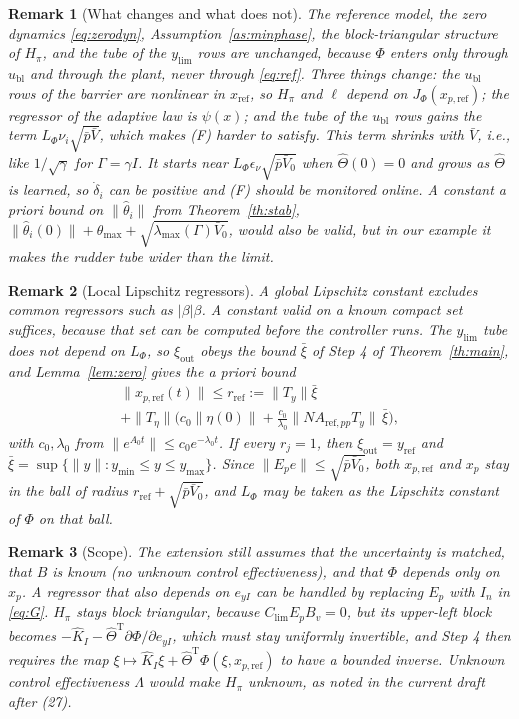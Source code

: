 \documentclass[lettersize,journal]{IEEEtran}
\newtheorem{remark}{Remark}
\newcommand{\Kh}{\hat{K}}
\newcommand{\xr}{x_{\mathrm{ref}}}
\newcommand{\xpr}{x_{p,\mathrm{ref}}}
\newcommand{\App}{A_{\mathrm{ref},pp}}
\newcommand{\ub}{u_{\mathrm{bl}}}
\newcommand{\yref}{y_{\mathrm{ref}}}
\newcommand{\Clim}{C_{\mathrm{lim}}}
\newcommand{\ylim}{y_{\mathrm{lim}}}
\newcommand{\eyI}{e_{yI}}
\newcommand{\Vb}{\bar{V}}
\newcommand{\tmax}{\theta_{\max}}
\newcommand{\T}{\mathrm{T}}
\begin{document}
\begin{remark}[What changes and what does not]
The reference model, the zero dynamics \eqref{eq:zerodyn}, Assumption~\ref{as:minphase}, the block-triangular structure of $H_\pi$, and the tube of the $\ylim$ rows are unchanged, because $\Phi$ enters only through $\ub$ and through the plant, never through \eqref{eq:ref}. Three things change: the $\ub$ rows of the barrier are nonlinear in $\xr$, so $H_\pi$ and $\ell$ depend on $J_\Phi(\xpr)$; the regressor of the adaptive law is $\psi(x)$; and the tube of the $\ub$ rows gains the term $L_\Phi\nu_i\sqrt{\bar p\Vb}$, which makes (F) harder to satisfy. This term shrinks with $\Vb$, i.e., like $1/\sqrt\gamma$ for $\Gamma=\gamma I$. It starts near $L_\Phi\epsilon_\nu\sqrt{\bar p\Vb_0}$ when $\hat\Theta(0)=0$ and grows as $\hat\Theta$ is learned, so $\dot\delta_i$ can be positive and (F) should be monitored online. A constant a priori bound on $\|\hat\theta_i\|$ from Theorem~\ref{th:stab}, $\|\hat\theta_i(0)\|+\tmax+\sqrt{\lambda_{\max}(\Gamma)\Vb_0}$, would also be valid, but in our example it makes the rudder tube wider than the limit.
\end{remark}

\begin{remark}[Local Lipschitz regressors]
A global Lipschitz constant excludes common regressors such as $|\beta|\beta$. A constant valid on a known compact set suffices, because that set can be computed before the controller runs. The $\ylim$ tube does not depend on $L_\Phi$, so $\xi_{\mathrm{out}}$ obeys the bound $\bar\xi$ of Step 4 of Theorem~\ref{th:main}, and Lemma~\ref{lem:zero} gives the a priori bound
\begin{multline*}
\|\xpr(t)\|\le r_{\mathrm{ref}}:=\|T_y\|\bar\xi \\
+ \|T_\eta\|\Big(c_0\|\eta(0)\|+\frac{c_0}{\lambda_0}\|N\App T_y\|\,\bar\xi\Big),
\end{multline*}
with $c_0,\lambda_0$ from $\|e^{A_0t}\|\le c_0e^{-\lambda_0t}$. If every $r_j=1$, then $\xi_{\mathrm{out}}=\yref$ and $\bar\xi=\sup\{\|y\|: y_{\min}\le y\le y_{\max}\}$. Since $\|E_pe\|\le\sqrt{\bar p\Vb_0}$, both $\xpr$ and $x_p$ stay in the ball of radius $r_{\mathrm{ref}}+\sqrt{\bar p\Vb_0}$, and $L_\Phi$ may be taken as the Lipschitz constant of $\Phi$ on that ball.
\end{remark}

\begin{remark}[Scope]
The extension still assumes that the uncertainty is matched, that $B$ is known (no unknown control effectiveness), and that $\Phi$ depends only on $x_p$. A regressor that also depends on $\eyI$ can be handled by replacing $E_p$ with $I_n$ in \eqref{eq:G}. $H_\pi$ stays block triangular, because $\Clim E_pB_v=0$, but its upper-left block becomes $-\Kh_I-\hat\Theta^\T\partial\Phi/\partial\eyI$, which must stay uniformly invertible, and Step 4 then requires the map $\xi\mapsto\Kh_I\xi+\hat\Theta^\T\Phi(\xi,\xpr)$ to have a bounded inverse. Unknown control effectiveness $\Lambda$ would make $H_\pi$ unknown, as noted in the current draft after (27).
\end{remark}
\end{document}

